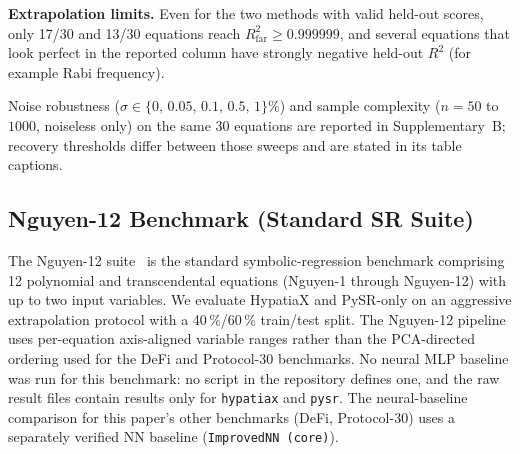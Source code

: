\documentclass[twoside,11pt]{article}
\newcommand{\Rsq}{R^{2}}
\begin{document}
\textbf{Extrapolation limits.} Even for the two methods with valid held-out scores, only 17/30 and 13/30
equations reach $\Rsq_{\text{far}} \geq 0.999999$, and several equations that look perfect in the reported
column have strongly negative held-out $\Rsq$ (for example Rabi frequency).



Noise robustness ($\sigma \in \{0,\,0.05,\,0.1,\,0.5,\,1\}\%$) and sample complexity ($n=50$ to $1000$, noiseless only) on the same 30 equations are reported in Supplementary~B; recovery thresholds differ between those sweeps and are stated in its table captions.

\subsection{Nguyen-12 Benchmark (Standard SR Suite)}\label{subsec:nguyen12-benchmark-standard-sr-suite}
\label{sec:nguyen12}

The Nguyen-12 suite~\citep{uy2011semantically} is the standard symbolic-regression
benchmark comprising 12 polynomial and transcendental equations (Nguyen-1 through
Nguyen-12) with up to two input variables.  We evaluate HypatiaX and PySR-only on
an aggressive extrapolation protocol with a 40\,\%/60\,\% train/test split.
The Nguyen-12 pipeline uses per-equation axis-aligned variable ranges 
rather than the PCA-directed ordering used for the DeFi and Protocol-30 benchmarks.
No neural MLP baseline was run for this benchmark: no script in the repository defines
one, and the raw result files
contain results only for \texttt{hypatiax} and \texttt{pysr}. The neural-baseline
comparison for this paper's other benchmarks (DeFi, Protocol-30) uses a separately
verified NN baseline (\texttt{ImprovedNN (core)}).
\end{document}
